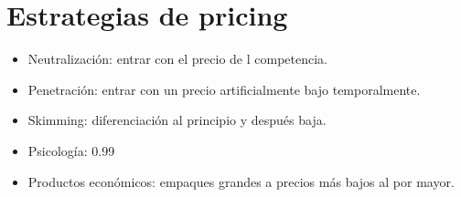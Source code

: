 \documentclass{article}
\begin{document}
\section{Estrategias de pricing}
\begin{itemize}
    \item Neutralización: entrar con el precio de l competencia.
    \item Penetración: entrar con un precio artificialmente bajo temporalmente.
    \item Skimming: diferenciación al principio y después baja. 
    \item Psicología: 0.99
    \item Productos económicos: empaques grandes a precios más bajos al por mayor.
\end{itemize}


\end{document}
